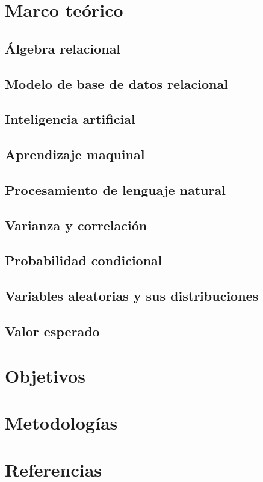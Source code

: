\documentclass[12pt,letterpaper]{article}
\begin{document}
  
%
\tableofcontents
\pagebreak
\section {Marco teórico}\label{sec:marcot}
\subsection {Álgebra relacional}\label{subsec:algebra}
\subsection {Modelo de base de datos relacional}\label{subsch:rdb}
\subsection {Inteligencia artificial}\label{subsec:intela}
\subsection {Aprendizaje maquinal}\label{subsec:machinel}
\subsection {Procesamiento de lenguaje natural}\label{subsec:nlp}
\subsection {Varianza y correlación}\label{subsec:corrl}
\subsection {Probabilidad condicional}\label{subsec:pcond}
\subsection {Variables aleatorias y sus distribuciones}\label{subsec:vayd}
\subsection {Valor esperado}\label{subsec:valesp}
\section {Objetivos}\label{sec:objetivos}
\section {Metodologías}\label{sec:metod}
\section {Referencias}
\label{sec:refs}
\printbibliography[heading=none]
\end{document}
